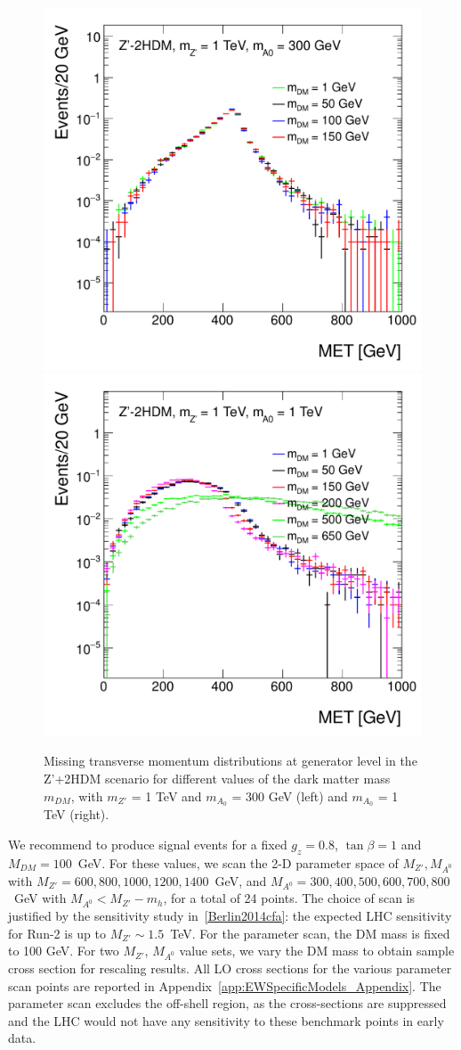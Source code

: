   \begin{figure}[hbpt!]
  	\begin{center}
  		\includegraphics[width=0.49\linewidth]{figures/EW/monoH/zp2hdm_a0_300_MET_et_Log}
  		\includegraphics[width=0.49\linewidth]{figures/EW/monoH/zp2hdm_a0_1000_MET_et_Log}
  		\caption{Missing transverse momentum distributions at generator level in the Z'+2HDM 
  			scenario for different values of the dark matter mass $m_{DM}$, with 
  			$m_{Z'}$ = 1 TeV and $m_{A_0}$ = 300 GeV (left) and $m_{A_0}$ = 1 TeV (right).
  			\label{fig:zprimeDecay}}
  	\end{center}
  \end{figure}
  
We recommend to produce signal events for a fixed $g_z=0.8$, $\tan{\beta}=1$ and $M_{DM}=100$~GeV. For these values, we scan the 2-D parameter space of ${M_{Z'}, M_{A^0}}$ with $M_{Z'}=600, 800, 1000, 1200, 1400$~GeV, and $M_{A^0}=300, 400, 500, 600, 700, 800$~GeV with $M_{A^0} < M_{Z'}-m_h$, for a total of 24 points. The choice of scan is justified by the sensitivity study in~\ref{Berlin2014cfa}: the expected LHC sensitivity for Run-2 is up to $M_{Z'} \sim 1.5$~TeV.
For the parameter scan, the DM mass is fixed to 100 GeV. For two $M_{Z'}$, $M_{A^0}$ value sets, we vary the DM mass to obtain sample cross section for rescaling results. 
All LO cross sections for the various parameter scan points are reported in Appendix~\ref{app:EWSpecificModels_Appendix}.
The parameter scan excludes the off-shell region, as the cross-sections are suppressed and the LHC would not have any
sensitivity to these benchmark points in early data. 

